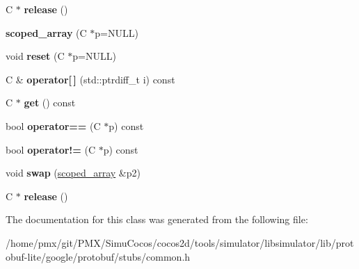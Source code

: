 \begin{DoxyCompactItemize}
C $\ast$ {\bfseries release} ()
\item 
\mbox{\label{classgoogle_1_1protobuf_1_1internal_1_1scoped__array_adada44af07e862d7a2433cd689bc38e4}} 
{\bfseries scoped\+\_\+array} (C $\ast$p=N\+U\+LL)
\item 
\mbox{\label{classgoogle_1_1protobuf_1_1internal_1_1scoped__array_aa7bf77fe3ad67c4c895b86d9d171c89e}} 
void {\bfseries reset} (C $\ast$p=N\+U\+LL)
\item 
\mbox{\label{classgoogle_1_1protobuf_1_1internal_1_1scoped__array_a4fcfa25e15c264a25ae178f4d44865dc}} 
C \& {\bfseries operator\mbox{[}$\,$\mbox{]}} (std\+::ptrdiff\+\_\+t i) const
\item 
\mbox{\label{classgoogle_1_1protobuf_1_1internal_1_1scoped__array_a8510a65165e66c6768af4d221e53c429}} 
C $\ast$ {\bfseries get} () const
\item 
\mbox{\label{classgoogle_1_1protobuf_1_1internal_1_1scoped__array_ad1aeafea94b94a8f2ca40a204f6ee4a7}} 
bool {\bfseries operator==} (C $\ast$p) const
\item 
\mbox{\label{classgoogle_1_1protobuf_1_1internal_1_1scoped__array_a278fb6d05d13ce87f7051d2a2c71cdb4}} 
bool {\bfseries operator!=} (C $\ast$p) const
\item 
\mbox{\label{classgoogle_1_1protobuf_1_1internal_1_1scoped__array_a1b9b06f4fcce4f6d3ae0034bad1a66a4}} 
void {\bfseries swap} (\hyperlink{classgoogle_1_1protobuf_1_1internal_1_1scoped__array}{scoped\+\_\+array} \&p2)
\item 
\mbox{\label{classgoogle_1_1protobuf_1_1internal_1_1scoped__array_a06ef762940ac81e151525935db6fd855}} 
C $\ast$ {\bfseries release} ()
\end{DoxyCompactItemize}


The documentation for this class was generated from the following file\+:\begin{DoxyCompactItemize}
\item 
/home/pmx/git/\+P\+M\+X/\+Simu\+Cocos/cocos2d/tools/simulator/libsimulator/lib/protobuf-\/lite/google/protobuf/stubs/common.\+h\end{DoxyCompactItemize}
